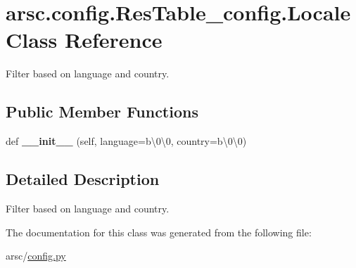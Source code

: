 \hypertarget{classarsc_1_1config_1_1ResTable__config_1_1Locale}{}\section{arsc.\+config.\+Res\+Table\+\_\+config.\+Locale Class Reference}
\label{classarsc_1_1config_1_1ResTable__config_1_1Locale}


Filter based on language and country.  


\subsection*{Public Member Functions}
\begin{DoxyCompactItemize}
\item 
\mbox{\label{classarsc_1_1config_1_1ResTable__config_1_1Locale_acdb0865b2fd5e8d9a957e1e8dbc946b8}} 
def {\bfseries \+\_\+\+\_\+init\+\_\+\+\_\+} (self, language=b\textquotesingle{}\textbackslash{}0\textbackslash{}0\textquotesingle{}, country=b\textquotesingle{}\textbackslash{}0\textbackslash{}0\textquotesingle{})
\end{DoxyCompactItemize}


\subsection{Detailed Description}
Filter based on language and country. 

The documentation for this class was generated from the following file\+:\begin{DoxyCompactItemize}
\item 
arsc/\mbox{\hyperlink{config_8py}{config.\+py}}\end{DoxyCompactItemize}
